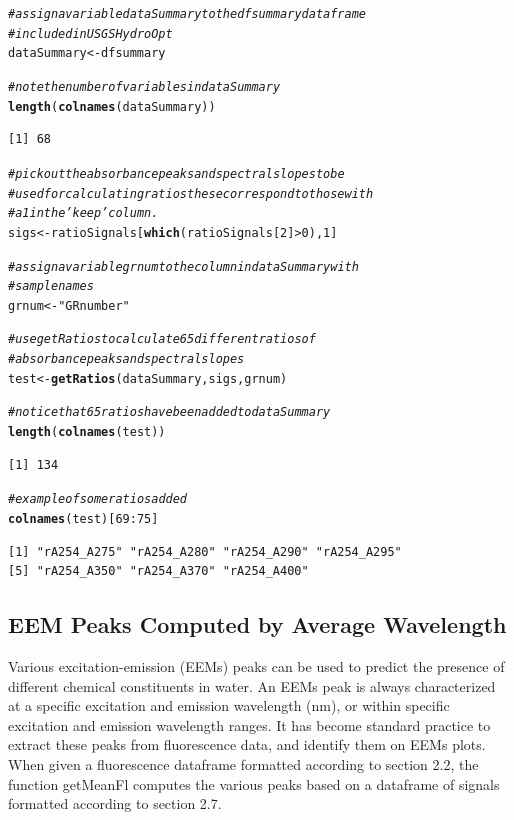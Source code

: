 \documentclass[a4paper,11pt]{article}\usepackage[]{graphicx}\usepackage[]{color}
\makeatletter
\newcommand{\hlnum}[1]{\textcolor[rgb]{0.686,0.059,0.569}{#1}}%
\newcommand{\hlstr}[1]{\textcolor[rgb]{0.192,0.494,0.8}{#1}}%
\newcommand{\hlcom}[1]{\textcolor[rgb]{0.678,0.584,0.686}{\textit{#1}}}%
\newcommand{\hlopt}[1]{\textcolor[rgb]{0,0,0}{#1}}%
\newcommand{\hlstd}[1]{\textcolor[rgb]{0.345,0.345,0.345}{#1}}%
\newcommand{\hlkwb}[1]{\textcolor[rgb]{0.69,0.353,0.396}{#1}}%
\newcommand{\hlkwd}[1]{\textcolor[rgb]{0.737,0.353,0.396}{\textbf{#1}}}%
\newenvironment{kframe}{%
 \def\at@end@of@kframe{}%
 \ifinner\ifhmode%
  \def\at@end@of@kframe{\end{minipage}}%
  \begin{minipage}{\columnwidth}%
 \fi\fi%
 \def\FrameCommand##1{\hskip\@totalleftmargin \hskip-\fboxsep
 \colorbox{shadecolor}{##1}\hskip-\fboxsep
     \hskip-\linewidth \hskip-\@totalleftmargin \hskip\columnwidth}%
 \MakeFramed {\advance\hsize-\width
   \@totalleftmargin\z@ \linewidth\hsize
   \@setminipage}}%
 {\par\unskip\endMakeFramed%
 \at@end@of@kframe}
\newenvironment{knitrout}{}{} %
\makeatother
\begin{document}
\begin{knitrout}
\color{fgcolor}\begin{kframe}
\begin{alltt}
\hlcom{# assign a variable dataSummary to the dfsummary dataframe}
\hlcom{# included in USGSHydroOpt}
\hlstd{dataSummary} \hlkwb{<-} \hlstd{dfsummary}

\hlcom{# note the number of variables in dataSummary}
\hlkwd{length}\hlstd{(}\hlkwd{colnames}\hlstd{(dataSummary))}
\end{alltt}
\begin{verbatim}
[1] 68
\end{verbatim}
\begin{alltt}
\hlcom{# pick out the absorbance peaks and spectral slopes to be}
\hlcom{# used for calculating ratios these correspond to those with}
\hlcom{# a 1 in the 'keep' column.}
\hlstd{sigs} \hlkwb{<-} \hlstd{ratioSignals[}\hlkwd{which}\hlstd{(ratioSignals[}\hlnum{2}\hlstd{]} \hlopt{>} \hlnum{0}\hlstd{),} \hlnum{1}\hlstd{]}

\hlcom{# assign a variable grnum to the column in dataSummary with}
\hlcom{# sample names}
\hlstd{grnum} \hlkwb{<-} \hlstr{"GRnumber"}

\hlcom{# use getRatios to calculate 65 different ratios of}
\hlcom{# absorbance peaks and spectral slopes}
\hlstd{test} \hlkwb{<-} \hlkwd{getRatios}\hlstd{(dataSummary, sigs, grnum)}

\hlcom{# notice that 65 ratios have been added to dataSummary}
\hlkwd{length}\hlstd{(}\hlkwd{colnames}\hlstd{(test))}
\end{alltt}
\begin{verbatim}
[1] 134
\end{verbatim}
\begin{alltt}
\hlcom{# example of some ratios added}
\hlkwd{colnames}\hlstd{(test)[}\hlnum{69}\hlopt{:}\hlnum{75}\hlstd{]}
\end{alltt}
\begin{verbatim}
[1] "rA254_A275" "rA254_A280" "rA254_A290" "rA254_A295"
[5] "rA254_A350" "rA254_A370" "rA254_A400"
\end{verbatim}
\end{kframe}
\end{knitrout}

\subsection{EEM Peaks Computed by Average Wavelength}
Various excitation-emission (EEMs) peaks can be used to predict the presence of different chemical constituents in water. An EEMs peak is always characterized at a specific excitation and emission wavelength (nm), or within specific excitation and emission wavelength ranges. It has become standard practice to extract these peaks from fluorescence data, and identify them on EEMs plots. When given a fluorescence dataframe formatted according to section 2.2, the function getMeanFl computes the various peaks based on a dataframe of signals formatted according to section 2.7. 
\end{document}
